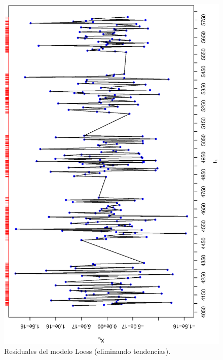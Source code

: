 \begin{figure}[h]
    \begin{minipage}{0.45\textwidth}
        \includegraphics[width=0.8\linewidth,angle = 270]{Kap3/Fig_Cap3/agn_detrend.eps}
        \caption{Residuales del modelo Loess (eliminando tendencias).}
        \label{fig:example_agn_detrend}
    \end{minipage}
    \hfill
    \begin{minipage}{0.45\textwidth}

\end{minipage}
\end{figure}

